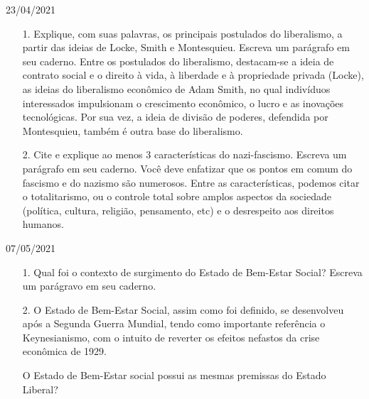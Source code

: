 \documentclass{SchoolBook}
\begin{document}
    \begin{day}{23/04/2021}
        \begin{enumerate}
            \item[1.] Explique, com suas palavras, os principais postulados do liberalismo, a partir das ideias de Locke, Smith e Montesquieu. Escreva um parágrafo em seu caderno.
            \response Entre os postulados do liberalismo, destacam-se a ideia de contrato social e o direito à vida, à liberdade e à propriedade privada (Locke), as ideias do liberalismo econômico de Adam Smith, no qual indivíduos interessados impulsionam o crescimento econômico, o lucro e as inovações tecnológicas.
            Por sua vez, a ideia de divisão de poderes, defendida por Montesquieu, também é outra base do liberalismo.

            \item[2.] Cite e explique ao menos 3 características do nazi-fascismo. Escreva um parágrafo em seu caderno.
            \response Você deve enfatizar que os pontos em comum do fascismo e do nazismo são numerosos. Entre as características, podemos citar o totalitarismo, ou o controle total sobre amplos aspectos da sociedade (política, cultura, religião, pensamento, etc) e o desrespeito aos direitos humanos.
        \end{enumerate}
    \end{day}
    
    \begin{day}{07/05/2021}
        \begin{enumerate}
            \item[1.] Qual foi o contexto de surgimento do Estado de Bem-Estar Social? Escreva um parágravo em seu caderno.
            
            \item[2.] O Estado de Bem-Estar Social, assim como foi definido, se desenvolveu após a Segunda Guerra Mundial, tendo como importante referência o Keynesianismo, com o intuito de reverter os efeitos nefastos da crise econômica de 1929.
            
            O Estado de Bem-Estar social possui as mesmas premissas do Estado Liberal?
        \end{enumerate}
    \end{day}
    
\end{document}
